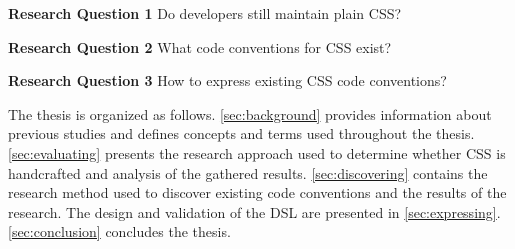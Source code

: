   \begin{description}
    \item \textbf{Research Question 1} Do developers still maintain plain CSS?
    \item \textbf{Research Question 2} What code conventions for CSS exist?
    \item \textbf{Research Question 3} How to express existing CSS code conventions?
  \end{description}

The thesis is organized as follows. \autoref{sec:background} provides
information about previous studies and defines concepts and terms used
throughout the thesis. \autoref{sec:evaluating} presents the research approach
used to determine whether CSS is handcrafted and analysis of the gathered
results. \autoref{sec:discovering} contains the research method  used to
discover existing code conventions and the results of the research. The design
and validation of the DSL are presented in \autoref{sec:expressing}.
\autoref{sec:conclusion} concludes the thesis.

